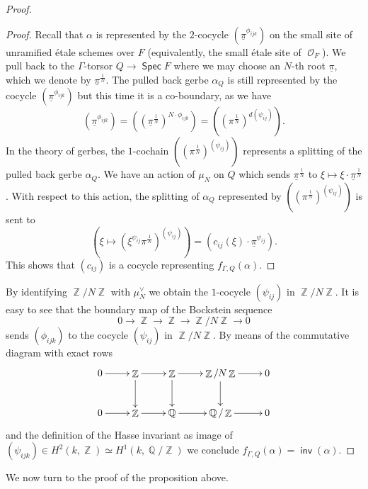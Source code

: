\documentclass{article}
\DeclareMathOperator{\inv}{\mathsf{inv}}
\DeclareMathOperator{\Zb}{\mathbb{Z}}
\DeclareMathOperator{\Spec}{\mathsf{Spec}}
\DeclareMathOperator{\Oo}{\mathcal{O}}
\DeclareMathOperator{\Qb}{\mathbb{Q}}
\theoremstyle{definition}
\theoremstyle{plain}
\begin{document}
\begin{proof}
\begin{proof}
Recall that $\alpha$ is represented by the $2$-cocycle $(\underline{\pi}^{\phi_{ijk}})$ on the small site of unramified \'etale schemes over $F$ (equivalently, the small \'etale site of $\Oo_F$). We pull back to the $\Gamma$-torsor $Q \to \Spec F$ where we may choose an $N$-th root $\underline{\pi}$, which we denote by $\underline{\pi}^{\frac{1}{N}}$. The pulled back gerbe $\alpha_Q$ is still represented by the cocycle $(\underline{\pi}^{\phi_{ijk}})$ but this time it is a co-boundary, as we have 
$$(\underline{\pi}^{\phi_{ijk}}) = \left((\underline{\pi}^{\frac{1}{N}})^{N\cdot{}\phi_{ijk}}\right) = \left( (\pi^{\frac{1}{N}})^{d(\psi_{ij})} \right).$$
In the theory of gerbes, the $1$-cochain $\left( (\pi^{\frac{1}{N}})^{(\psi_{ij})} \right)$ represents a splitting of the pulled back gerbe $\alpha_Q$.
We have an action of $\mu_N$ on $Q$ which sends $\underline{\pi}^{\frac{1}{N}}$ to $\xi \mapsto \xi \cdot{} \underline{\pi}^{\frac{1}{N}}$. With respect to this action, the splitting of $\alpha_Q$ represented by $\left( (\pi^{\frac{1}{N}})^{(\psi_{ij})} \right)$ is sent to 
$$\left(\xi \mapsto  (\xi^{\psi_{ij}}\pi^{\frac{1}{N}})^{(\psi_{ij})} \right) = \left( c_{ij}(\xi)\cdot{} \underline{\pi}^{\psi_{ij}} \right) .$$
This shows that $(c_{ij})$ is a cocycle representing $f_{\Gamma,Q}(\alpha)$.
\end{proof}

By identifying $\Zb/N\Zb$ with $\mu_N^{\vee}$ we obtain the $1$-cocycle $(\psi_{ij})$ in $\Zb/N\Zb$. It is easy to see that the boundary map of the Bockstein sequence
$$0 \to \Zb \to \Zb \to \Zb/N\Zb \to 0$$
sends $(\phi_{ijk})$ to the cocycle $(\psi_{ij})$ in $\Zb/N\Zb$. By means of the commutative diagram with exact rows
\[
\xymatrix{
0 \ar[r] & \Zb \ar[r] \ar[d] & \Zb \ar[r] \ar[d] & \Zb/N\Zb \ar[r] \ar[d] & 0 \\
0 \ar[r] & \Zb \ar[r] & \Qb \ar[r] & \Qb/\Zb \ar[r] & 0
}
\]
and the definition of the Hasse invariant as image of $(\psi_{ijk}) \in H^2(k,\Zb) \simeq H^1(k,\Qb/\Zb)$ we conclude $f_{\Gamma,Q}(\alpha) = \inv(\alpha)$.
%
\end{proof}

We now turn to the proof of the proposition above.
\end{document}
